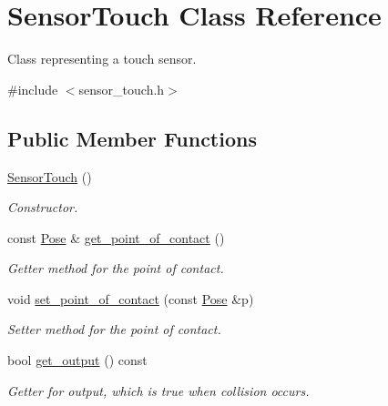 \hypertarget{class_sensor_touch}{}\section{Sensor\+Touch Class Reference}
\label{class_sensor_touch}


Class representing a touch sensor.  




{\ttfamily \#include $<$sensor\+\_\+touch.\+h$>$}

\subsection*{Public Member Functions}
\begin{DoxyCompactItemize}
\item 
\mbox{\label{class_sensor_touch_ab8e0dc693ec2fbc1aa5ff25ee2bfdb19}} 
\mbox{\hyperlink{class_sensor_touch_ab8e0dc693ec2fbc1aa5ff25ee2bfdb19}{Sensor\+Touch}} ()
\begin{DoxyCompactList}\small\item\em Constructor. \end{DoxyCompactList}\item 
const \mbox{\hyperlink{struct_pose}{Pose}} \& \mbox{\hyperlink{class_sensor_touch_a9f56fd943758125611863ce2bc0d9365}{get\+\_\+point\+\_\+of\+\_\+contact}} ()
\begin{DoxyCompactList}\small\item\em Getter method for the point of contact. \end{DoxyCompactList}\item 
void \mbox{\hyperlink{class_sensor_touch_a2ef6d89a8e763e21f82e03a3033a490f}{set\+\_\+point\+\_\+of\+\_\+contact}} (const \mbox{\hyperlink{struct_pose}{Pose}} \&p)
\begin{DoxyCompactList}\small\item\em Setter method for the point of contact. \end{DoxyCompactList}\item 
\mbox{\label{class_sensor_touch_a0f48ab24f852395dbec807fe652d80b1}} 
bool \mbox{\hyperlink{class_sensor_touch_a0f48ab24f852395dbec807fe652d80b1}{get\+\_\+output}} () const
\begin{DoxyCompactList}\small\item\em Getter for output, which is true when collision occurs. \end{DoxyCompactList}\item 

\end{DoxyCompactItemize}
